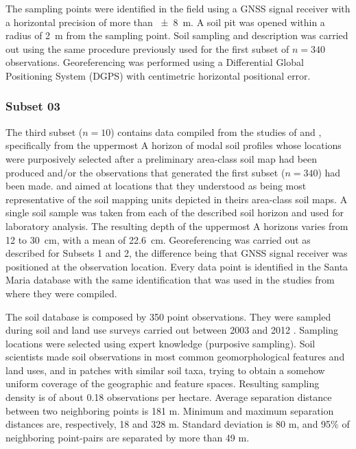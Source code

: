 The sampling points were identified in the field using a GNSS signal receiver with a horizontal 
precision of more than \SI{\pm8}{\metre}. A soil pit was opened within a radius of \SI{2}{\metre} from 
the sampling point. Soil sampling and description was carried out using the same procedure previously 
used for the first subset of $n = 340$ observations. Georeferencing was performed using a Differential
Global Positioning System (DGPS) with centimetric horizontal positional error.

\subsubsection{Subset 03}

The third subset ($n = 10$) contains data compiled from the studies of  and
, specifically from the uppermost A horizon of modal soil profiles whose locations 
were purposively selected after a preliminary area-class soil map had been produced and/or the observations
that generated the first subset ($n = 340$) had been made.  and 
aimed at locations that they understood as being most representative of the soil mapping units depicted 
in theirs area-class soil maps. A single soil sample was taken from each of the described soil horizon and 
used for laboratory analysis. The resulting depth of the uppermost A horizons varies from \num{12} to 
\SI{30}{\centi\metre}, with a mean of \SI{22.6}{\centi\metre}. Georeferencing was carried out as described
for Subsets \num{1} and \num{2}, the difference being that GNSS signal receiver was positioned at the
observation location. Every data point is identified in the Santa Maria database with the same 
identification that was used in the studies from where they were compiled.














The soil database is composed by 350 point observations. They were sampled during soil and land use surveys carried out between 2003 and 2012 \cite{Pedron2005, SamuelRosaEtAl2011a, MiguelEtAl2012}. Sampling locations were selected using expert knowledge (purposive sampling). Soil scientists made soil observations in most common geomorphological features and land uses, and in patches with similar soil taxa, trying to obtain a somehow uniform coverage of the geographic and feature spaces. Resulting sampling density is of about 0.18 observations per hectare. Average separation distance between two neighboring points is 181 m. Minimum and maximum separation distances are, respectively, 18 and 328 m. Standard deviation is 80 m, and 95\% of neighboring point-pairs are separated by more than 49 m.



